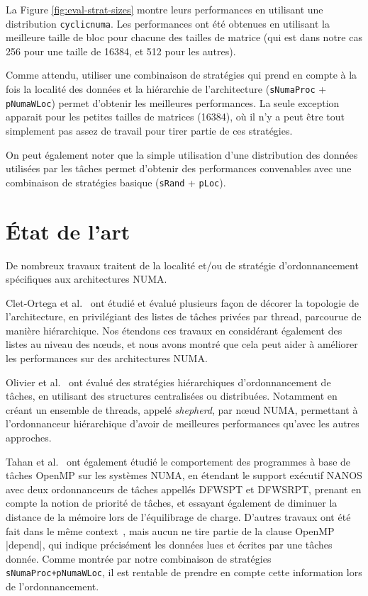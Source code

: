 \documentclass[parallelisme]{compas2016}
\begin{document}
La Figure \ref{fig:eval-strat-sizes} montre leurs performances en utilisant une distribution
\verb/cyclicnuma/.
Les performances ont été obtenues en utilisant la meilleure taille de bloc pour
chacune des tailles de matrice (qui est dans notre cas 256 pour une taille de 16384,
et 512 pour les autres).

Comme attendu, utiliser une combinaison de stratégies qui prend en compte à la fois
la localité des données et la hiérarchie de l'architecture (\verb/sNumaProc/ + \verb/pNumaWLoc/)
permet d'obtenir les meilleures performances.
La seule exception apparait pour les petites tailles de matrices (16384), où il
n'y a peut être tout simplement pas assez de travail pour tirer partie de ces stratégies. 

On peut également noter que la simple utilisation d'une distribution des données
utilisées par les tâches permet d'obtenir des performances convenables avec une
combinaison de stratégies basique (\verb/sRand/ + \verb/pLoc/).

\section{État de l'art}
\label{sec:related-work}

De nombreux travaux traitent de la localité et/ou de stratégie d'ordonnancement
spécifiques aux architectures NUMA.

Clet-Ortega et al.~\cite{DBLP:conf/europar/Clet-OrtegaCP14} ont étudié et évalué plusieurs
façon de décorer la topologie de l'architecture, en privilégiant des listes de tâches
privées par thread, parcourue de manière hiérarchique. Nos étendons ces travaux
en considérant également des listes au niveau des nœuds, et nous avons montré
que cela peut aider à améliorer les performances sur des architectures NUMA.

Olivier et al.~\cite{DBLP:journals/ijhpca/OlivierPWSP12} ont évalué des stratégies
hiérarchiques d'ordonnancement de tâches, en utilisant des structures centralisées
ou distribuées. Notamment en créant un ensemble de threads, appelé \emph{shepherd}, par
nœud NUMA, permettant à l'ordonnanceur hiérarchique d'avoir de meilleures performances
qu'avec les autres approches.

Tahan et al.~\cite{DBLP:journals/corr/Tahan14} ont également étudié le comportement
des programmes à base de tâches OpenMP sur les systèmes NUMA, en étendant le
support exécutif NANOS avec deux ordonnanceurs de tâches appellés DFWSPT et DFWSRPT,
prenant en compte la notion de priorité de tâches, et essayant également de diminuer
la distance de la mémoire lors de l'équilibrage de charge.
D'autres travaux ont été fait dans le même context~\cite{DBLP:conf/europar/TerbovenSCM12,DBLP:journals/corr/abs-1101-0093},
mais aucun ne tire partie de la clause OpenMP |depend|, qui indique précisément les
données lues et écrites par une tâches donnée. Comme montrée par notre combinaison
de stratégies \verb/sNumaProc+pNumaWLoc/, il est rentable de prendre en compte
cette information lors de l'ordonnancement.
\end{document}
